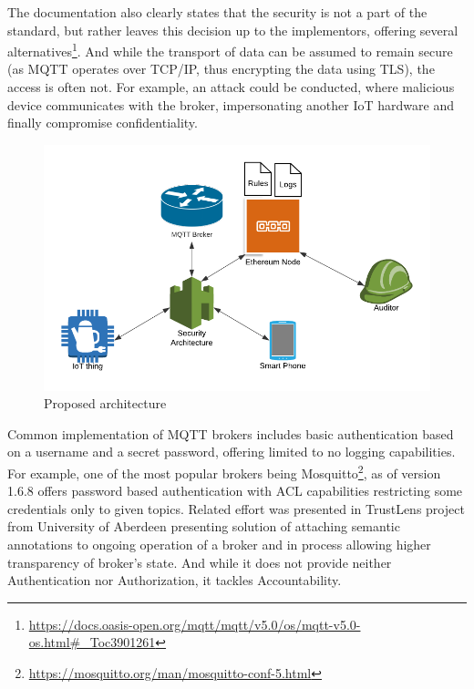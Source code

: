 \documentclass[a4paper,12pt]{article}
\begin{document}
The documentation also clearly states that the security is not a part of the standard, but rather leaves this decision up to the implementors, offering several alternatives\footnote{\url{https://docs.oasis-open.org/mqtt/mqtt/v5.0/os/mqtt-v5.0-os.html\#\_Toc3901261}}. And while the transport of data can be assumed to remain secure (as MQTT operates over TCP/IP, thus encrypting the data using TLS), the access is often not. For example, an attack could be conducted, where malicious device communicates with the broker, impersonating another IoT hardware and finally compromise confidentiality.

\begin{figure}[ht]
  \centering
  \includegraphics[scale=0.8]{iot_attack}
  \caption{Proposed architecture}\label{fig:iot1}
\end{figure}

Common implementation of MQTT brokers includes basic authentication based on a username and a secret password, offering limited to no logging capabilities. For example, one of the most popular brokers being Mosquitto\footnote{\url{https://mosquitto.org/man/mosquitto-conf-5.html}}, as of version 1.6.8 offers password based authentication with ACL capabilities restricting some credentials only to given topics. Related effort was presented in TrustLens project from University of Aberdeen presenting solution of attaching semantic annotations to ongoing operation of a broker and in process allowing higher transparency of broker's state\cite{10.1145/3366610.3368099}. And while it does not provide neither Authentication nor Authorization, it tackles Accountability.
\end{document}

